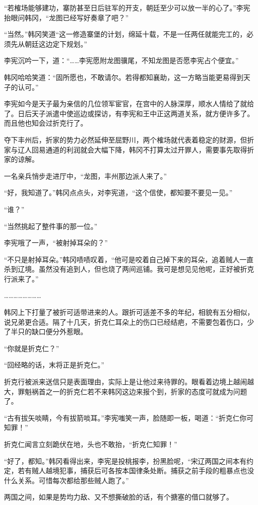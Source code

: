 “若榷场能够建功，寨防甚至日后驻军的开支，朝廷至少可以放一半的心了。”李宪抬眼问韩冈，“龙图已经写好奏章了吧？”

“当然。”韩冈笑道“这一修造寨堡的计划，绵延十载，不是一任两任就能完工的，必须先从朝廷这边定下规划。”

李宪沉吟一下，道：“……李宪愿附龙图骥尾，不知龙图是否愿李宪占个便宜。”

韩冈哈哈笑道：“固所愿也，不敢请尔。若得都知襄助，这一方略当能更易得到天子的认可。”

李宪如今是天子最为亲信的几位领军宦官，在宫中的人脉深厚，顺水人情给了就给了。日后天子派遣中使巡边或探访，有李宪和王中正这两道关系，就方便许多了。而且他也知会过折克行了。

夺下丰州后，折家的势力必然延伸至屈野川，两个榷场就代表着稳定的财源，但折家与辽人回易通道的利润就会大幅下降，韩冈不打算太过开罪人，需要事先取得折家的谅解。

一名亲兵悄步走进厅中，“龙图，丰州那边派人来了。”

“好，我知道了。”韩冈点点头，对李宪道，“这个信使，都知要不要见一见。”

“谁？”

“当然挑起了整件事的那一位。”

李宪哦了一声，“被射掉耳朵的？”

“不只是射掉耳朵。”韩冈啧啧叹着，“他可是咬着自己掉下来的耳朵，追着贼人一直杀到辽境。虽然没有追到人，但也烧了两间巡铺。我可是想见见他呢，正好被折克行派来了。”

……………………

韩冈上下打量了被折可适带进来的人。跟折可适差不多的年纪，相貌有五分相似，说兄弟更合适。隔了十几天，折克仁耳朵上的伤口已经结疤，不需要包着伤口，少了半只的缺口便分外惹眼。

“你就是折克仁？”

“回经略的话，末将正是折克仁。”

折克行被派来送信只是表面理由，实际上是让他过来待罪的。眼看着边境上越闹越大，罪魁祸首之一的折克仁若不来韩冈这边来报个到，折家的态度可就成为问题了。

“古有拔矢啖睛，今有拔箭啖耳。”李宪嗤笑一声，脸随即一板，喝道：“折克仁你可知罪！”

折克仁闻言立刻跪伏在地，头也不敢抬，“折克仁知罪！”

“好了，都知。”韩冈看得出来，李宪是投桃报李，扮黑脸呢，“宋辽两国之间本有约定，若有贼人越境犯事，捕获后可各按本国律条处断。捕获之前手段的粗暴点也没什么关系。可惜每次都给那些贼人跑了。”

两国之间，如果是势均力敌、又不想撕破脸的话，有个搪塞的借口就够了。

